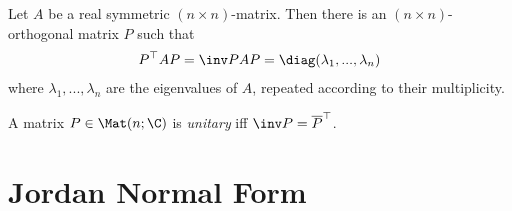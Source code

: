 \documentclass{article}
\begin{document}
\begin{corollary}
	Let $A$ be a real symmetric $(n\times n)$-matrix. Then there is an $(n\times n)$-orthogonal matrix $P$
	such that
	\begin{align*}
		P^\top AP = \inv PAP = \diag(\lambda_1,...,\lambda_n)
	\end{align*}
	where $\lambda_1,...,\lambda_n$ are the eigenvalues of $A$, repeated according to their multiplicity.
\end{corollary}

\begin{definition}
	A matrix $P\in\Mat(n;\C)$ is \emph{unitary} iff $\inv P=\overline{P}^\top$.
\end{definition}

\section{Jordan Normal Form}
\end{document}
